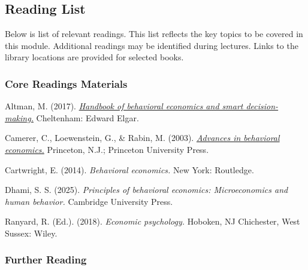 \documentclass[
  x11names]{article}
\begin{document}
\pagebreak

\subsection{Reading List}\label{reading-list}

Below is list of relevant readings. This list reflects the key topics to
be covered in this module. Additional readings may be identified during
lectures. Links to the library locations are provided for selected
books.

\subsubsection{Core Readings Materials}\label{core-readings-materials}

\noindent \vspace{-2em} \setlength{\parindent}{-0.5in}
\setlength{\leftskip}{0.5in} \setlength{\parskip}{7.5pt}

Altman, M. (2017).
\href{https://uol.primo.exlibrisgroup.com/discovery/fulldisplay?docid=alma991003444459703496&context=L&vid=353UOL_INST:353UOL_VU1&lang=en&search_scope=MyInst_and_CI&adaptor=Local\%20Search\%20Engine&tab=TAB1&query=any,contains,Handbook\%20of\%20behavioral\%20economics\%20and\%20smart\%20decision-making.&sortby=rank&facet=rtype,include,books&offset=0}{\color{blue}\emph{Handbook
of behavioral economics and smart decision-making.}\color{black}}
Cheltenham: Edward Elgar.

Camerer, C., Loewenstein, G., \& Rabin, M. (2003).
\href{https://uol.primo.exlibrisgroup.com/discovery/fulldisplay?docid=alma991001289209703496&context=L&vid=353UOL_INST:353UOL_VU1&lang=en&search_scope=MyInst_and_CI&adaptor=Local\%20Search\%20Engine&tab=TAB1&query=any,contains,Advances\%20in\%20behavioral\%20economics&sortby=rank&offset=0}{\color{blue}\emph{Advances
in behavioral economics.}\color{black}} Princeton, N.J.; Princeton
University Press.

Cartwright, E. (2014). \emph{Behavioral economics.} New York: Routledge.

Dhami, S. S. (2025). \emph{Principles of behavioral economics:
Microeconomics and human behavior.} Cambridge University Press.

Ranyard, R. (Ed.). (2018). \emph{Economic psychology.} Hoboken, NJ
Chichester, West Sussex: Wiley.

\setlength{\leftskip}{0in}

\subsubsection{Further Reading}\label{further-reading}
\end{document}
